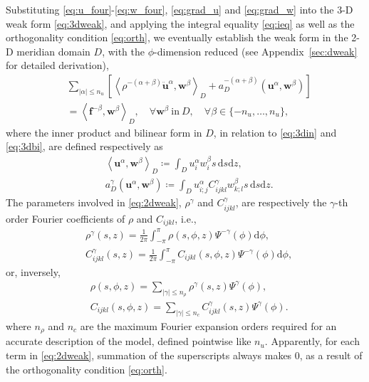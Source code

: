 \documentclass[extra]{gji}
\begin{document}
Substituting \eqref{eq:u_four}-\eqref{eq:w_four}, \eqref{eq:grad_u} and 
\eqref{eq:grad_w} into the 3-D weak form \eqref{eq:3dweak}, and 
applying the integral equality \eqref{eq:ieq} as well as the orthogonality condition
\eqref{eq:orth}, we eventually establish the weak form in the 2-D meridian 
domain $D$, with the $\phi$-dimension reduced (see 
Appendix~\ref{sec:dweak} for detailed derivation),
\begin{equation}
  \begin{alignedat}{1}
    & \sum_{|\alpha|\le n_u} \left[ 
    \left\langle \rho^{-\left(\alpha+\beta\right)}
    \ddot{\mathbf{u}}^\alpha,\mathbf{w}^\beta \right\rangle _{D}
    + a_D^{-\left(\alpha+\beta\right)}
    \left(\mathbf{u}^\alpha,\mathbf{w}^\beta\right)\right] \\&= 
    \left\langle \mathbf{f}^{-\beta},\mathbf{w}^\beta \right\rangle _{D},\quad
    \forall \mathbf{w}^\beta\ \text{in}\ D, \quad 
    \forall \beta\in \{-n_u,\dots,n_u\},
  \end{alignedat}
\label{eq:2dweak}
\end{equation}
where the inner product and bilinear form in $D$, in relation to 
\eqref{eq:3din} and \eqref{eq:3dbi}, are defined respectively as 
\begin{align}
  & \left\langle \mathbf{u}^\alpha,\mathbf{w}^\beta\right\rangle _{D}
  \coloneqq \int_D u_i^\alpha w_i^\beta s\,\text{d}s\text{d}z, \\[.5em]
  & a_D^\gamma \left(\mathbf{u}^\alpha,\mathbf{w}^\beta\right)\coloneqq
  \int_D u_{i;j}^\alpha C_{ijkl}^\gamma w_{k;l}^\beta s\,\text{d}s\text{d}z.
  \label{eq:bi}
\end{align}
The parameters involved in \eqref{eq:2dweak},
$\rho^\gamma$ and $C_{ijkl}^\gamma$, are respectively
the $\gamma$-th order Fourier coefficients of $\rho$ and $C_{ijkl}$, i.e.,
\begin{align}
  & \rho^\gamma\left(s,z\right)=
  \frac{1}{2\pi}\int_{-\pi}^{\pi}\rho\left(s,\phi,z\right)\Psi^{-\gamma}\left(\phi\right)\text{d}\phi,
  \label{eq:four_rho} \\[.5em]
  & C_{ijkl}^\gamma\left(s,z\right)=
  \frac{1}{2\pi}\int_{-\pi}^{\pi}C_{ijkl}\left(s,\phi,z\right)\Psi^{-\gamma}\left(\phi\right)\text{d}\phi,
  \label{eq:four_c}
\end{align}
or, inversely,
\begin{align}
  & \rho\left(s,\phi,z\right)=\sum_{|\gamma|\le n_\rho} 
  \rho^\gamma\left(s,z\right) \Psi^{\gamma}\left(\phi\right),
  \label{eq:ifour_rho} \\[.5em]
  & C_{ijkl}\left(s,\phi,z\right)=\sum_{|\gamma|\le n_c} 
  C_{ijkl}^\gamma\left(s,z\right) \Psi^{\gamma}\left(\phi\right).
  \label{eq:ifour_c}
\end{align}
where $n_\rho$ and $n_c$ are the maximum Fourier expansion orders 
required for an accurate description of the model, defined pointwise like $n_u$.
Apparently, for each term in \eqref{eq:2dweak}, summation of the 
superscripts always makes 0, as a result of 
the orthogonality condition \eqref{eq:orth}.
\end{document}

